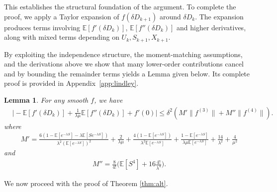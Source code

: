 \documentclass[11pt,letterpaper,reqno]{article}
\theoremstyle{thmstyleone}%
\theoremstyle{thmstyletwo}%
\newtheorem{lemma}{Lemma}
\theoremstyle{thmstylethree}%
\numberwithin{equation}{section}
\begin{document}
This establishes the structural foundation of the argument. To complete the proof, we apply a Taylor expansion of $f(\delta D_{k+1})$ around $\delta D_k$. The expansion produces terms involving $\mathbb E[f'(\delta D_k)]$, $\mathbb E[f''(\delta D_k)]$ and higher derivatives, along with mixed terms depending on $U_k,S_{k+1},X_{k+1}$.

By exploiting the independence structure, the moment-matching assumptions, and the derivations above we show that many lower-order contributions cancel and by bounding the remainder terms  yields 
a Lemma given below. Its complete  proof is provided in  Appendix~\ref{app:lindley}.

\begin{lemma}\label{lemma:alt}
 For any smooth $f$,  we have
    \begin{align}\label{eq:delta-bound}
     &\bigg|- \mathbb E[f'(\delta D_k)]+\frac{1}{\lambda \mu} \mathbb E[f''(\delta D_k)]+f'(0)\bigg|\leq \delta^2(M'\|f^{(3)}\|+M''\|f^{(4)}\|). 
\end{align}
where 
\begin{align*}
    M'=\frac{6\left(1 - \mathbb E[e^{-\lambda S}] - \lambda \mathbb E[S e^{-\lambda S}]\right)}{\lambda^2 (\mathbb E[e^{-\lambda S}])^2}+\frac{2}{\lambda \mu} +\frac{4(1-\mathbb E[e^{-\lambda S}])}{\lambda^2\mathbb E[e^{-\lambda S}]}+\frac{1-\mathbb E[e^{-\lambda S}]}{\lambda\mu \mathbb E[e^{-\lambda S}]}+\frac{14}{\lambda^2}+\frac{4}{\mu^2}
\end{align*}
and
\begin{align*}
M''=\frac{8}{4!} \bigg(\mathbb E[S^4] +16\frac{4!}{\lambda^4}\bigg).
\end{align*}
\end{lemma}
 We now proceed with the proof of Theorem \ref{thm:alt}.
\end{document}
